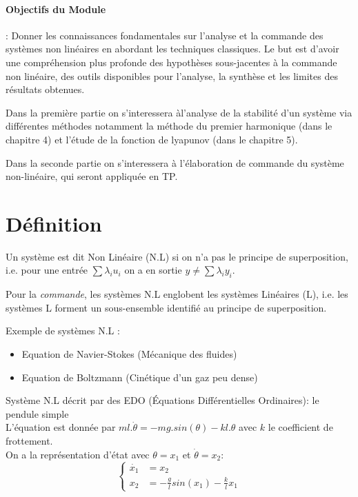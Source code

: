 \documentclass[main.tex]{subfiles}
\begin{document}
\paragraph{Objectifs du Module}: Donner les connaissances fondamentales sur l'analyse et la commande des systèmes non linéaires en abordant les techniques classiques. Le but est d'avoir une compréhension plus profonde des hypothèses sous-jacentes à la commande non linéaire, des outils disponibles pour l'analyse, la synthèse et les limites des résultats obtenues.

Dans la première partie on s'interessera àl'analyse de la stabilité d'un système via différentes méthodes notamment la méthode du premier harmonique (dans le chapitre 4) et l'étude de la fonction de lyapunov (dans le chapitre 5).

Dans la seconde partie on s'interessera à l'élaboration de commande du système non-linéaire, qui seront appliquée en TP.
\section{Définition}

\begin{defin}
Un système est dit Non Linéaire (N.L) si on n'a pas le principe de superposition, i.e. pour une entrée $\sum \lambda_i u_i$ on a en sortie $y \neq \sum \lambda_iy_i$.
\end{defin}


Pour la \emph{commande}, les systèmes N.L englobent les systèmes Linéaires (L), i.e. les systèmes L forment un sous-ensemble identifié au principe de superposition.

Exemple de systèmes N.L :
\begin{itemize}
\item Equation de Navier-Stokes (Mécanique des fluides)
\item Equation de Boltzmann (Cinétique d'un gaz peu dense)
\end{itemize}

\begin{example}
  Système N.L décrit par des EDO (Équations Différentielles Ordinaires): le pendule simple\\
L'équation est donnée par $ml.\dot{\theta} = -mg.sin(\theta) - kl.\theta$ avec $k$ le coefficient de frottement.\\
On a la représentation d'état avec $\theta = x_1$ et $\dot{\theta} = x_2:$\\
\[\left \{\begin{array}{cc}
  \dot{x_1} & = x_2\\
  x_2 & = -\frac{g}{l}sin(x_1) - \frac{k}{l}x_1
\end{array}\right.\]
\end{example}
\end{document}
